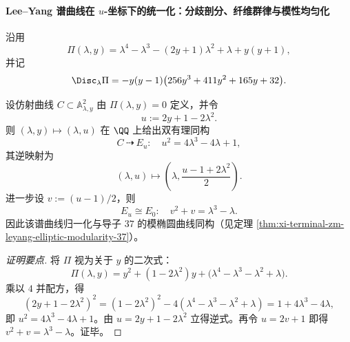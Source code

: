 \paragraph{Lee--Yang 谱曲线在 \texorpdfstring{$u$}{u}-坐标下的统一化：分歧剖分、纤维群律与模性均匀化}
沿用
\[
\Pi(\lambda,y)=\lambda^{4}-\lambda^{3}-(2y+1)\lambda^{2}+\lambda+y(y+1),
\]
并记
\[
\Disc_{\lambda}\Pi=-y(y-1)\bigl(256y^{3}+411y^{2}+165y+32\bigr).
\]

\begin{conclusion}\label{con:xi-terminal-zm-leyang-u-coordinate-birational-37a1}
设仿射曲线 \(C\subset\mathbb A^2_{\lambda,y}\) 由 \(\Pi(\lambda,y)=0\) 定义，并令
\[
u:=2y+1-2\lambda^{2}.
\]
则 \((\lambda,y)\mapsto(\lambda,u)\) 在 \(\QQ\) 上给出双有理同构
\[
C\ \dashrightarrow\ E_u:\quad u^{2}=4\lambda^{3}-4\lambda+1,
\]
其逆映射为
\[
(\lambda,u)\longmapsto\left(\lambda,\frac{u-1+2\lambda^2}{2}\right).
\]
进一步设 \(v:=(u-1)/2\)，则
\[
E_u\cong E_0:\quad v^2+v=\lambda^3-\lambda.
\]
因此该谱曲线归一化与导子 \(37\) 的模椭圆曲线同构（见定理 \ref{thm:xi-terminal-zm-leyang-elliptic-modularity-37}）。
\end{conclusion}
\begin{proof}[证明要点]
将 \(\Pi\) 视为关于 \(y\) 的二次式：
\[
\Pi(\lambda,y)=y^2+(1-2\lambda^2)y+\bigl(\lambda^4-\lambda^3-\lambda^2+\lambda\bigr).
\]
乘以 \(4\) 并配方，得
\[
(2y+1-2\lambda^2)^2=(1-2\lambda^2)^2-4(\lambda^4-\lambda^3-\lambda^2+\lambda)=1+4\lambda^3-4\lambda,
\]
即 \(u^2=4\lambda^3-4\lambda+1\)。由 \(u=2y+1-2\lambda^2\) 立得逆式。再令 \(u=2v+1\) 即得 \(v^2+v=\lambda^3-\lambda\)。证毕。
\end{proof}

